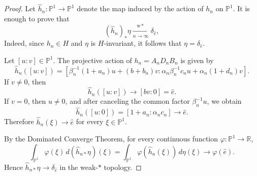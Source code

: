 \documentclass[a4paper,12pt,reqno]{amsart}
\numberwithin{equation}{section}
\newcommand{\Pp}{{\mathbb{P}}}
\newcommand{\Rr}{{\mathbb{R}}}
\begin{document}
\begin{proof}
Let $\widehat{h}_n \colon \mathbb P^1 \to \mathbb P^1$ denote the map induced by the action of $h_n$ on $\mathbb P^1$. It is enough to prove that
\[
(\widehat{h}_n)_*\eta \xrightarrow[n\to\infty]{\mathrm{w}*}\delta_{\hat e},
\]
Indeed, since $h_n\in H$ and $\eta$ is $H$-invariant, it follows that $\eta = \delta_{\hat e}$.

Let $[u:v]\in\Pp^1$. The projective action of $h_n=A_nD_nB_n$ is given by
\[
\widehat h_n([u:v])
=
\left[
\beta_n^{-1}(1+a_n)u+(b+b_n)v:
\alpha_n\beta_n^{-1}c_nu+\alpha_n(1+d_n)v
\right].
\]
If $v\neq0$, then 
\[
\widehat h_n([u:v])\longrightarrow [bv:0]=\hat e.
\]
If $v=0$, then $u\neq0$, and after canceling the common factor
$\beta_n^{-1}u$, we obtain
\[
\widehat h_n([u:0])
=
[1+a_n:\alpha_n c_n]
\longrightarrow \hat e.
\]
Therefore $\widehat h_n(\xi)\to\hat e$ for every $\xi\in\Pp^1$. 

By the Dominated Converge Theorem, for every continuous function $\varphi\colon\Pp^1\to\Rr$,
\[
\int_{\Pp^1}\varphi(\xi)\,d(\widehat h_{n*} \eta)(\xi)
=
\int_{\Pp^1}\varphi(\widehat h_n(\xi))\,d\eta(\xi)
\longrightarrow
\varphi(\hat e).
\]
Hence $\widehat h_{n*} \eta\to\delta_{\hat e}$ in the weak-$*$ topology. 
\end{proof}

%
%
\end{document}
